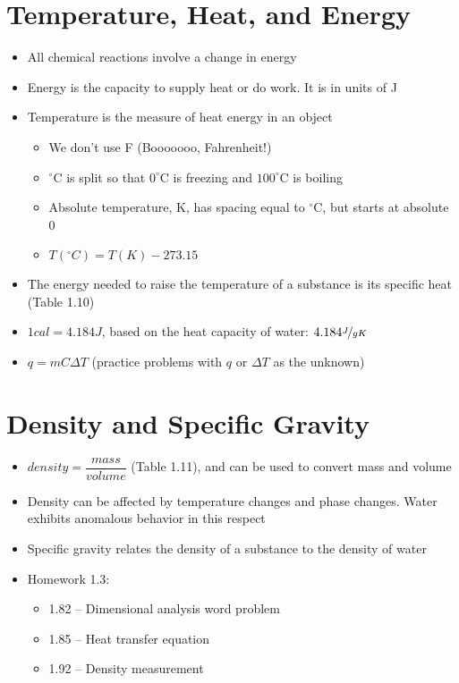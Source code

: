 \documentclass[12pt, openany, letterpaper]{memoir}
\begin{document}
\section{Temperature, Heat, and Energy}
\begin{itemize}
	\item All chemical reactions involve a change in energy
	\item Energy is the capacity to supply heat or do work. It is in units of J
	\item Temperature is the measure of heat energy in an object
	\begin{itemize}
		\item We don't use F (Booooooo, Fahrenheit!)
		\item $^\circ$C is split so that $0^\circ$C is freezing and $100^\circ$C is boiling
		\item Absolute temperature, K, has spacing equal to $^\circ$C, but starts at absolute 0
		\item $T( ^\circ C) = T(K)-273.15$
	\end{itemize}
	\item The energy needed to raise the temperature of a substance is its specific heat (Table 1.10)	
	\item $1cal=4.184J$, based on the heat capacity of water: $4.184\nicefrac{J}{gK}$
	\item $q=mC\Delta T$ (practice problems with $q$ or $\Delta T$ as the unknown)
\end{itemize}
\section{Density and Specific Gravity}
\begin{itemize}
	\item $density=\dfrac{mass}{volume}$ (Table 1.11), and can be used to convert mass and volume 
	\item Density can be affected by temperature changes and phase changes. Water exhibits anomalous behavior in this respect
	\item Specific gravity relates the density of a substance to the density of water
	\item Homework 1.3:
	\begin{itemize}
		\item 1.82 -- Dimensional analysis word problem
		\item 1.85 -- Heat transfer equation
		\item 1.92 -- Density measurement
	\end{itemize}
\end{itemize}
\end{document}
